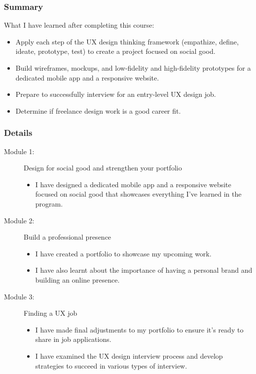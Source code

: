 \subsubsection{Summary}
\begin{flushleft}
	What I have learned after completing this course:
	\begin{itemize}
		\item Apply each step of the UX design thinking framework (empathize, define, ideate, prototype, test) to create a  project focused on social good.
		\item Build wireframes, mockups, and low-fidelity and high-fidelity prototypes for a dedicated mobile app and a responsive website.
		\item Prepare to successfully interview for an entry-level UX design job.
		\item Determine if freelance design work is a good career fit.
	\end{itemize}
\end{flushleft}

\subsubsection{Details}
\begin{flushleft}
	\begin{description}
		\item[Module 1:] Design for social good and strengthen your portfolio
		      \begin{itemize}
			      \item I have designed a dedicated mobile app and a responsive website focused on social good that showcases everything I've learned in the program.
		      \end{itemize}
		\item[Module 2:] Build a professional presence
		      \begin{itemize}
			      \item I have created a portfolio to showcase my upcoming work.
			      \item I have also learnt about the importance of having a personal brand and building an online presence.
		      \end{itemize}
		\item[Module 3:] Finding a UX job
		      \begin{itemize}
			      \item I have made final adjustments to my portfolio to ensure it's ready to share in job applications.
			      \item I have examined the UX design interview process and develop strategies to succeed in various types of interview.
		      \end{itemize}
	\end{description}
\end{flushleft}